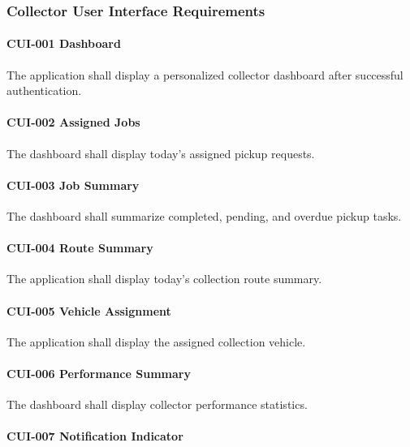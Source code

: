 
\subsubsection*{Collector User Interface Requirements}

\paragraph{CUI-001 Dashboard}

The application shall display a personalized collector dashboard after
successful authentication.

\paragraph{CUI-002 Assigned Jobs}

The dashboard shall display today's assigned pickup requests.

\paragraph{CUI-003 Job Summary}

The dashboard shall summarize completed, pending, and overdue pickup
tasks.

\paragraph{CUI-004 Route Summary}

The application shall display today's collection route summary.

\paragraph{CUI-005 Vehicle Assignment}

The application shall display the assigned collection vehicle.

\paragraph{CUI-006 Performance Summary}

The dashboard shall display collector performance statistics.

\paragraph{CUI-007 Notification Indicator}

